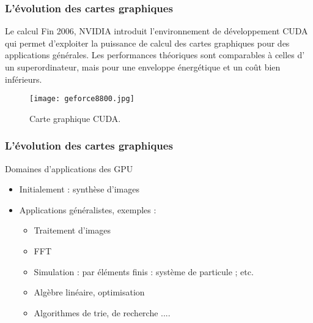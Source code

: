 \begin{frame}
  \frametitle{L'évolution des cartes graphiques}
\begin{block}{Le calcul}
    Fin 2006, NVIDIA introduit l'environnement de développement CUDA qui
    permet d'exploiter la puissance de calcul des cartes graphiques pour des applications générales.
    Les performances théoriques sont comparables à celles d' un 
    superordinateur, mais  pour une enveloppe énergétique et un coût bien inférieurs.

    \begin{figure}[htbp]
        \centering
       \texttt{[image: geforce8800.jpg]} 
        \caption{Carte graphique CUDA.}
        \label{fig:gforce8}
    \end{figure}
\end{block}
\end{frame}

\begin{frame}
  \frametitle{L'évolution des cartes graphiques}
\begin{block}{Domaines d'applications des GPU}
 \begin{itemize}
    \item Initialement : synthèse d'images
    \item Applications généralistes, exemples :
     \begin{itemize}
        \item Traitement d'images
        \item FFT
        \item Simulation : par éléments finis : système de particule ; etc.
        \item Algèbre linéaire, optimisation
        \item Algorithmes de trie, de recherche ....
    \end{itemize}
\end{itemize}   
\end{block}
\end{frame}

